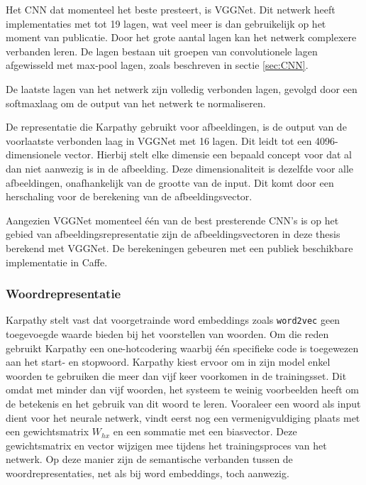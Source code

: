 Het CNN dat momenteel het beste presteert, is VGGNet\cite{Arge2015}. Dit netwerk heeft implementaties met tot 19 lagen, wat veel meer is dan gebruikelijk op het moment van publicatie. Door het grote aantal lagen kan het netwerk complexere verbanden leren. De lagen bestaan uit groepen van convolutionele lagen afgewisseld met max-pool lagen, zoals beschreven in sectie \ref{sec:CNN}.

De laatste lagen van het netwerk zijn volledig verbonden lagen, gevolgd door een softmaxlaag om de output van het netwerk te normaliseren. 

De representatie die Karpathy gebruikt voor afbeeldingen, is de output van de voorlaatste verbonden laag in VGGNet met 16 lagen. Dit leidt tot een 4096-dimensionele vector. Hierbij stelt elke dimensie een bepaald concept voor dat al dan niet aanwezig is in de afbeelding. Deze dimensionaliteit is dezelfde voor alle afbeeldingen, onafhankelijk van de grootte van de input. Dit komt door een herschaling voor de berekening van de afbeeldingsvector.

Aangezien VGGNet momenteel \'e\'en van de best presterende CNN's is op het gebied van afbeeldingsrepresentatie zijn de afbeeldingsvectoren in deze thesis berekend met VGGNet. De berekeningen gebeuren met een publiek beschikbare implementatie in Caffe\cite{Jia2014}.

\subsubsection{Woordrepresentatie}
Karpathy\cite{Karpathy2015} stelt vast dat voorgetrainde word embeddings zoals \texttt{word2vec} geen toegevoegde waarde bieden bij het voorstellen van woorden. Om die reden gebruikt Karpathy een one-hotcodering waarbij \'e\'en specifieke code is toegewezen aan het start- en stopwoord. Karpathy kiest ervoor om in zijn model enkel woorden te gebruiken die meer dan vijf keer voorkomen in de trainingsset. Dit omdat met minder dan vijf woorden, het systeem te weinig voorbeelden heeft om de betekenis en het gebruik van dit woord te leren. Vooraleer een woord als input dient voor het neurale netwerk, vindt eerst nog een vermenigvuldiging plaats met een gewichtsmatrix $W_{hx}$ en een sommatie met een biasvector. Deze gewichtsmatrix en vector wijzigen mee tijdens het trainingsproces van het netwerk. Op deze manier zijn de semantische verbanden tussen de woordrepresentaties, net als bij word embeddings, toch aanwezig.

